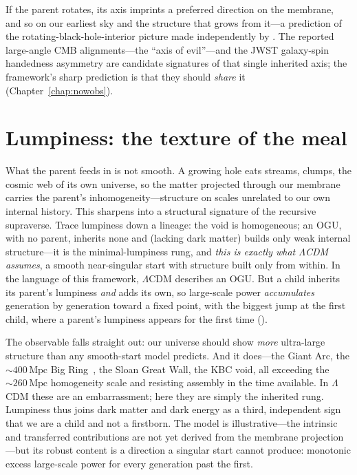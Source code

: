If the parent rotates, its axis imprints a preferred direction on the membrane,
and so on our earliest sky and the structure that grows from it---a prediction of the
rotating-black-hole-interior picture made independently by \citet{poplawski2019axis}.
The reported large-angle CMB alignments---the ``axis of evil''---and the JWST galaxy-spin
handedness asymmetry are candidate signatures of that single inherited axis; the
framework's sharp prediction is that they should \emph{share} it
(Chapter~\ref{chap:nowobs}).

\section{Lumpiness: the texture of the meal}
\label{sec:lumpiness}

What the parent feeds in is not smooth. A growing hole eats streams, clumps, the
cosmic web of its own universe, so the matter projected through our membrane
carries the parent's inhomogeneity---structure on scales unrelated to our own
internal history. This sharpens into a structural signature of the recursive
supraverse. Trace lumpiness down a lineage: the void is homogeneous; an OGU, with
no parent, inherits none and (lacking dark matter) builds only weak internal
structure---it is the minimal-lumpiness rung, and \emph{this is exactly what
$\Lambda$CDM assumes}, a smooth near-singular start with structure built only from
within. In the language of this framework, $\Lambda$CDM describes an OGU. But a
child inherits its parent's lumpiness \emph{and} adds its own, so large-scale power
\emph{accumulates} generation by generation toward a fixed point, with the biggest
jump at the first child, where a parent's lumpiness appears for the first time
().

The observable falls straight out: our universe should show \emph{more}
ultra-large structure than any smooth-start model predicts. And it does---the
Giant Arc, the $\sim\!400\,\mathrm{Mpc}$ Big Ring~\citep{lopez2024bigring}, the
Sloan Great Wall, the KBC void, all exceeding the $\sim\!260\,\mathrm{Mpc}$
homogeneity scale and resisting assembly in the time available. In $\Lambda$CDM
these are an embarrassment; here they are simply the inherited rung. Lumpiness thus
joins dark matter and dark energy as a third, independent sign that we are a child
and not a firstborn. The model is illustrative---the intrinsic and transferred
contributions are not yet derived from the membrane projection---but its robust
content is a direction a singular start cannot produce: monotonic excess
large-scale power for every generation past the first.

